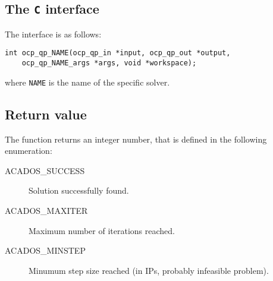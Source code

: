 \documentclass{report}
\begin{document}
\subsection{The \texttt{C} interface}
The interface is as follows:
\begin{verbatim}
int ocp_qp_NAME(ocp_qp_in *input, ocp_qp_out *output,
    ocp_qp_NAME_args *args, void *workspace);
\end{verbatim}
where \texttt{NAME} is the name of the specific solver.

\subsection{Return value}
The function returns an integer number, that is defined in the following enumeration:
\begin{description}
	\item[ACADOS\_SUCCESS] Solution successfully found.
	\item[ACADOS\_MAXITER] Maximum number of iterations reached.
	\item[ACADOS\_MINSTEP] Minumum step size reached (in IPs, probably infeasible problem).
\end{description}
\end{document}
